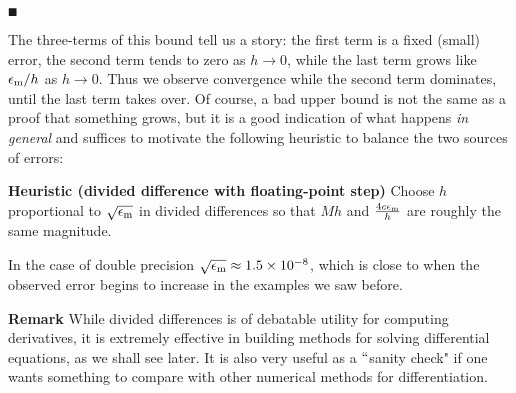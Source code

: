 \ensuremath{\QED}

The three-terms of this bound tell us a story: the first term is a fixed (small) error, the second term tends to zero as $h \rightarrow 0$, while the last term grows like $\ensuremath{\epsilon}_{\rm m}/h$ as $h \rightarrow 0$.  Thus we observe convergence while the second term dominates, until the last term takes over. Of course, a bad upper bound is not the same as a proof that something grows, but it is a good indication of  what happens \emph{in general} and suffices to motivate the following heuristic to balance the two sources of errors:

\textbf{Heuristic (divided difference with floating-point step)} Choose $h$ proportional to $\sqrt{\ensuremath{\epsilon}_{\rm m}}$ in divided differences  so that $M h$ and ${4c \ensuremath{\epsilon}_{\rm m} \over h}$ are roughly the same magnitude.

In the case of double precision $\sqrt{\ensuremath{\epsilon}_{\rm m}} \ensuremath{\approx} 1.5\times 10^{-8}$, which is close to when the observed error begins to increase in the examples we saw before. 

\textbf{Remark} While divided differences is of debatable utility for computing derivatives, it is extremely effective in building methods for solving differential equations, as we shall see later. It is also very useful as a \ensuremath{\ldq}sanity check" if one wants something to compare with other numerical methods for differentiation.



